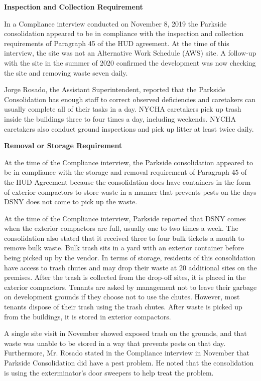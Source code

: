 
\textbf{Inspection and Collection Requirement}

In a Compliance interview conducted on November 8, 2019 the Parkside consolidation appeared to be in compliance with the inspection and collection requirements of Paragraph 45 of the HUD agreement. At the time of this interview, the site was not an Alternative Work Schedule (AWS) site. A follow-up with the site in the summer of 2020 confirmed the development was now checking the site and removing waste seven daily.

Jorge Rosado, the Assistant Superintendent, reported that the Parkside Consolidation has enough staff to correct observed deficiencies and caretakers can usually complete all of their tasks in a day. NYCHA caretakers pick up trash inside the buildings three to four times a day, including weekends. NYCHA caretakers also conduct ground inspections and pick up litter at least twice daily. 

\textbf{Removal or Storage Requirement}

At the time of the Compliance interview, the Parkside consolidation appeared to be in compliance with the storage and removal requirement of Paragraph 45 of the HUD Agreement because the consolidation does have containers in the form of exterior compactors to store waste in a manner that prevents pests on the days DSNY does not come to pick up the waste.  

At the time of the Compliance interview, Parkside reported that DSNY comes when the exterior compactors are full, usually one to two times a week. The consolidation also stated that it received three to four bulk tickets a month to remove bulk waste. Bulk trash sits in a yard with an exterior container before being picked up by the vendor. In terms of storage, residents of this consolidation have access to trash chutes and may drop their waste at 20 additional sites on the premises. After the trash is collected from the drop-off sites, it is placed in the exterior compactors. Tenants are asked by management not to leave their garbage on development grounds if they choose not to use the chutes. However, most tenants dispose of their trash using the trash chutes. After waste is picked up from the buildings, it is stored in exterior compactors.

A single site visit in November showed exposed trash on the grounds, and that waste was unable to be stored in a way that prevents pests on that day. Furthermore, Mr. Rosado stated in the Compliance interview in November that Parkside Consolidation did have a pest problem. He noted that the consolidation is using the exterminator's door sweepers to help treat the problem.

